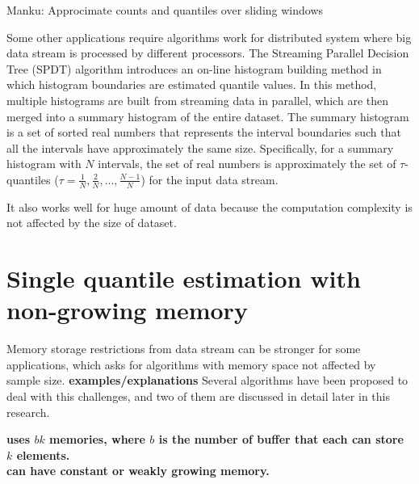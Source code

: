 Manku: Approcimate counts and quantiles over sliding windows

Some other applications require algorithms work for distributed system where big data stream is processed by different processors.
The Streaming Parallel Decision Tree (SPDT) algorithm \cite{ben-haimStreamingParallelDecision} introduces an on-line histogram building method %
in which histogram boundaries are estimated quantile values.
In this method, multiple histograms are built from streaming data in parallel, which are then merged into a summary histogram of the entire dataset. The summary histogram is a set of sorted real numbers that represents the interval boundaries such that all the intervals have approximately the same size. Specifically, for a summary histogram with $N$ intervals, the set of real numbers is approximately the set of $\tau$-quantiles ($\tau = \frac{1}{N}, \frac{2}{N}, ..., \frac{N-1}{N}$) for the input data stream.

 It also works well for huge amount of data because the computation complexity is not affected by the size of dataset.


\fi
\pagebreak

\iffalse
\section{Single quantile estimation with non-growing memory}
\label{singlequantile}
Memory storage restrictions from data stream can be stronger for some applications, which asks for algorithms with memory space not affected by sample size. 
\textbf{examples/explanations}
Several algorithms have been proposed to deal with this challenges, and two of them are discussed in detail later in this research.


\textbf{
\citeauthor{mankuApproximateMediansOthera} \cite{mankuApproximateMediansOthera} uses $bk$ memories, where $b$ is the number of buffer that each can store $k$ elements.
\\
\citeauthor{dunningComputingExtremelyAccurate2019} \cite{dunningComputingExtremelyAccurate2019} can have constant or weakly growing memory.
}

